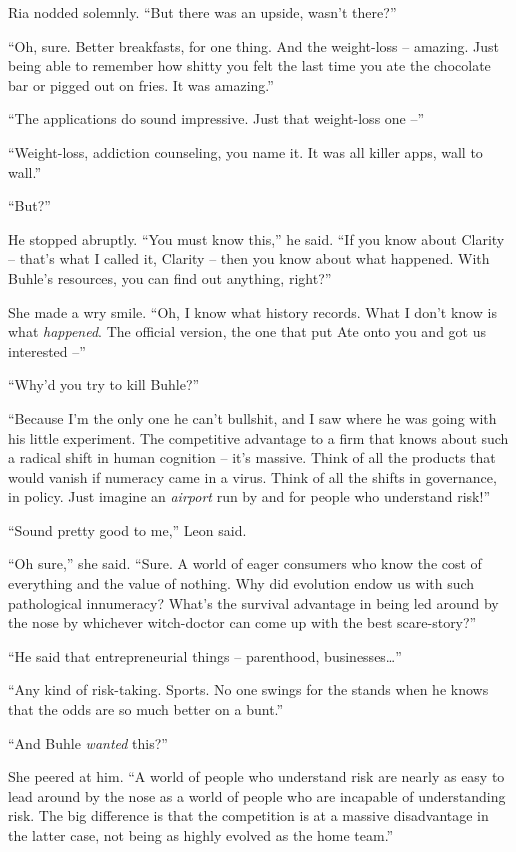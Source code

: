 Ria nodded solemnly. “But there was an upside, wasn't there?”

“Oh, sure. Better breakfasts, for one thing. And the weight-loss -- 
amazing. Just being able to remember how shitty you felt the last time 
you ate the chocolate bar or pigged out on fries. It was amazing.”

“The applications do sound impressive. Just that weight-loss one --”

“Weight-loss, addiction counseling, you name it. It was all killer 
apps, wall to wall.”

“But?”

He stopped abruptly. “You must know this,” he said. “If you know 
about Clarity -- that's what I called it, Clarity -- then you know 
about what happened. With Buhle's resources, you can find out anything, 
right?”

She made a wry smile. “Oh, I know what history records. What I don't 
know is what \emph{happened}. The official version, the one that put 
Ate onto you and got us interested --”

“Why'd you try to kill Buhle?”

“Because I'm the only one he can't bullshit, and I saw where he was 
going with his little experiment. The competitive advantage to a firm 
that knows about such a radical shift in human cognition -- it's 
massive. Think of all the products that would vanish if numeracy came 
in a virus. Think of all the shifts in governance, in policy. Just 
imagine an \emph{airport} run by and for people who understand risk!”

“Sound pretty good to me,” Leon said.

“Oh sure,” she said. “Sure. A world of eager consumers who know 
the cost of everything and the value of nothing. Why did evolution 
endow us with such pathological innumeracy? What's the survival 
advantage in being led around by the nose by whichever witch-doctor can 
come up with the best scare-story?”

“He said that entrepreneurial things -- parenthood, businesses\ldots{}”

“Any kind of risk-taking. Sports. No one swings for the stands when 
he knows that the odds are so much better on a bunt.”

“And Buhle \emph{wanted} this?”

She peered at him. “A world of people who understand risk are nearly 
as easy to lead around by the nose as a world of people who are 
incapable of understanding risk. The big difference is that the 
competition is at a massive disadvantage in the latter case, not being 
as highly evolved as the home team.”


